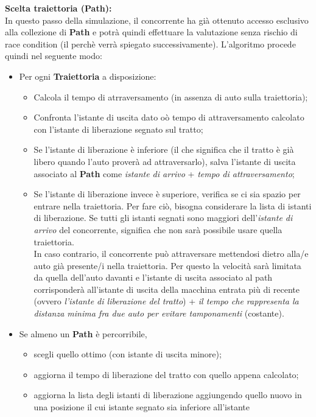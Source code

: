 \begin{description}
\item{\textbf{Scelta traiettoria (Path):}}\\
In questo passo della simulazione, il concorrente ha già ottenuto accesso esclusivo alla collezione di \textbf{Path} e potrà quindi
effettuare la valutazione senza rischio di race condition (il perchè verrà spiegato successivamente). L'algoritmo procede quindi nel
seguente modo:
\begin{itemize}
\item Per ogni \textbf{Traiettoria} a disposizione:
\begin{itemize}
\item Calcola il tempo di atrraversamento (in assenza di auto sulla traiettoria);
\item Confronta l'istante di uscita dato oò tempo di attraversamento calcolato con l'istante di liberazione
segnato sul tratto;
\item Se l'istante di liberazione è inferiore (il che significa che il tratto è già libero quando l'auto proverà ad attraversarlo),
salva l'istante di uscita associato al \textbf{Path} come \emph{istante di arrivo} + \emph{tempo di attraversamento};
\item Se l'istante di liberazione invece è superiore, verifica se ci sia spazio per entrare nella traiettoria. Per fare ciò, bisogna considerare
la lista di istanti di liberazione. Se tutti gli istanti segnati sono maggiori dell'\emph{istante di arrivo} del concorrente, significa che 
non sarà possibile usare quella traiettoria.\\
In caso contrario, il concorrente può attraversare mettendosi dietro alla/e auto già presente/i nella traiettoria. Per questo la velocità
sarà limitata da quella dell'auto davanti e l'istante di uscita associato al path 
corrisponderà all'istante di uscita della macchina entrata più di recente (ovvero
\emph{l'istante di liberazione del tratto}) + \emph{il tempo che rappresenta la distanza minima fra due auto per evitare tamponamenti} 
(costante).
\end{itemize}
\item Se almeno un \textbf{Path} è percorribile, 
\begin{itemize}
\item scegli quello ottimo (con istante di uscita minore);
\item aggiorna il tempo di liberazione del tratto con quello appena calcolato;
\item aggiorna la lista degli istanti di liberazione aggiungendo quello nuovo in una posizione il cui istante segnato sia inferiore all'istante

\end{itemize}
\end{itemize}
\end{description}
